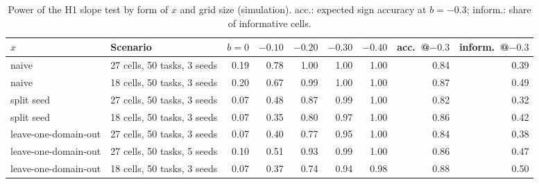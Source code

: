 \begin{table}[tbp]
\caption{Power of the H1 slope test by form of $x$ and grid size (simulation). acc.: expected sign accuracy at $b = -0.3$; inform.: share of informative cells.}
\label{tab:power}
\begin{center}
\footnotesize
\setlength{\tabcolsep}{4pt}
\begin{tabular}{@{}llrrrrrrr@{}}
\toprule
$x$ & Scenario & $b = 0$ & $-0.10$ & $-0.20$ & $-0.30$ & $-0.40$ & acc.\ @$-0.3$ & inform.\ @$-0.3$ \\
\midrule
naive & 27 cells, 50 tasks, 3 seeds & 0.19 & 0.78 & 1.00 & 1.00 & 1.00 & 0.84 & 0.39 \\
naive & 18 cells, 50 tasks, 3 seeds & 0.20 & 0.67 & 0.99 & 1.00 & 1.00 & 0.87 & 0.49 \\
split seed & 27 cells, 50 tasks, 3 seeds & 0.07 & 0.48 & 0.87 & 0.99 & 1.00 & 0.82 & 0.32 \\
split seed & 18 cells, 50 tasks, 3 seeds & 0.07 & 0.35 & 0.80 & 0.97 & 1.00 & 0.86 & 0.42 \\
leave-one-domain-out & 27 cells, 50 tasks, 3 seeds & 0.07 & 0.40 & 0.77 & 0.95 & 1.00 & 0.84 & 0.38 \\
leave-one-domain-out & 27 cells, 50 tasks, 5 seeds & 0.10 & 0.51 & 0.93 & 0.99 & 1.00 & 0.86 & 0.47 \\
leave-one-domain-out & 18 cells, 50 tasks, 3 seeds & 0.07 & 0.37 & 0.74 & 0.94 & 0.98 & 0.88 & 0.50 \\
\bottomrule
\end{tabular}
\end{center}
\end{table}
